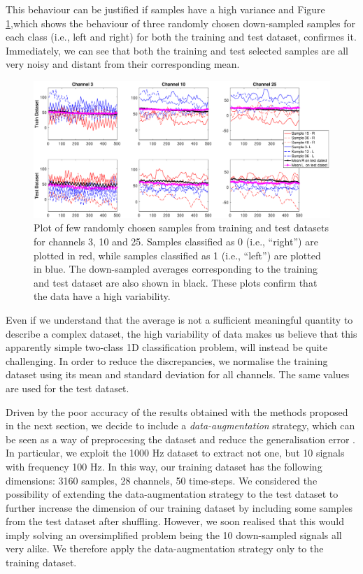 \documentclass{article}
\begin{document}
 This behaviour can be justified if  samples have a high variance and Figure \ref{fig_fewsamples_vs_mean_downsampled},which shows the behaviour of three randomly chosen down-sampled samples for each class (i.e., left and right) for both the training and test dataset, confirmes it. 
 Immediately, we can see that both the training and test selected samples are all very noisy and distant from their corresponding mean.
  \begin{figure}[h]
 \begin{center}
  \includegraphics[width=1\textwidth]{fig/fig5new_fewsamples_mean_downsampled} 
  \caption{Plot of few randomly chosen samples from training and test datasets for channels 3, 10 and 25.
  Samples classified as 0 (i.e., ``right'') are plotted in red, while   samples classified as 1 (i.e., ``left'') are plotted in blue.
  The down-sampled averages corresponding to the training and test dataset are also shown in black.
   These plots confirm that the data have a high variability. 
  \label{fig_fewsamples_vs_mean_downsampled}}
  \end{center}
  \end{figure}
  
 Even if we understand that the average is not a sufficient meaningful quantity to describe a complex dataset, the high variability of data makes us believe that this apparently simple two-class 1D classification problem, will instead be quite challenging. 
  In order to reduce the discrepancies, we  normalise the training dataset using its mean and standard deviation for all channels. 
  The same values are used for the test dataset. 
  
Driven by the poor accuracy of the results obtained with the methods proposed in the next section, we decide to include a \emph{data-augmentation} strategy, which can be seen as a way of preprocesing the dataset and reduce the generalisation error \cite{goodfellow2016deep}. 
In particular, we exploit the 1000 Hz dataset to extract not one, but 10  signals with frequency 100 Hz. 
In this way, our training dataset has the following dimensions: 3160 samples, 28 channels, 50 time-steps. 
We considered the possibility of extending the data-augmentation strategy to the test dataset to further increase the dimension of our training dataset by including some samples from the test dataset after shuffling. 
However, we soon realised that this would imply solving an oversimplified problem being the 10 down-sampled signals all very alike. 
We therefore apply the data-augmentation strategy only to the training dataset. 
\end{document}
